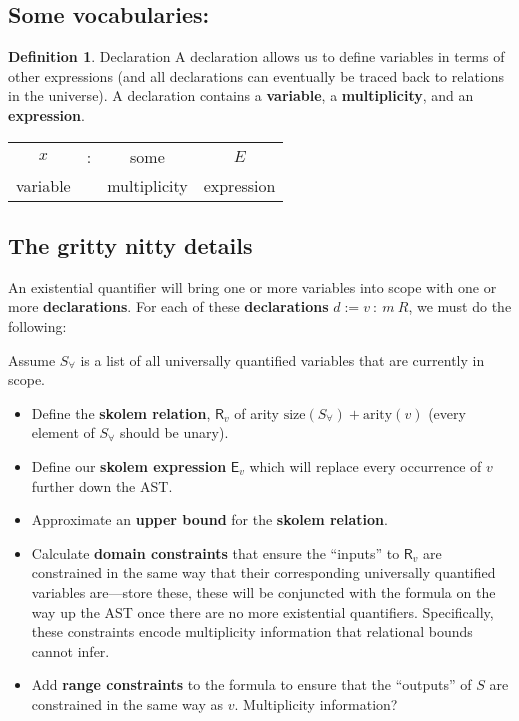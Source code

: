 \documentclass{article}
\theoremstyle{definition}
\newtheorem{definition}{Definition}[subsection]
\begin{document}
    \subsection{Some vocabularies:}

    \theoremstyle{definition}
    \begin{definition}{Declaration}
        A declaration allows us to define variables in terms of other expressions (and all declarations can eventually be traced back to relations in the universe). A declaration contains a \textbf{variable}, a \textbf{multiplicity}, and an \textbf{expression}.

        \begin{center}
            \begin{tabular}{c c c c}
                $x$ & : & some & $E$ \\
                variable & & multiplicity & expression
            \end{tabular}
        \end{center}
    \end{definition}

    \subsection{The gritty nitty details}

    An existential quantifier will bring one or more variables into scope with one or more \textbf{declarations}. For each of these \textbf{declarations} $d := v~:~m~R$, we must do the following:

    Assume $S_\forall$ is a list of all universally quantified variables that are currently in scope.

    \begin{itemize}
        \item Define the \textbf{skolem relation}, $\textsf{R}_v$ of arity $\text{size}(S_\forall) + \text{arity}(v)$ (every element of $S_\forall$ should be unary).
        \item Define our \textbf{skolem expression} $\textsf{E}_v$ which will replace every occurrence of $v$ further down the AST.
        \item Approximate an \textbf{upper bound} for the \textbf{skolem relation}.
        \item Calculate \textbf{domain constraints} that ensure the ``inputs'' to $\textsf{R}_v$ are constrained in the same way that their corresponding universally quantified variables are---store these, these will be conjuncted with the formula on the way up the AST once there are no more existential quantifiers. Specifically, these constraints encode multiplicity information that relational bounds cannot infer.
        \item Add \textbf{range constraints} to the formula to ensure that the ``outputs'' of $S$ are constrained in the same way as $v$. Multiplicity information?
    \end{itemize}
\end{document}
